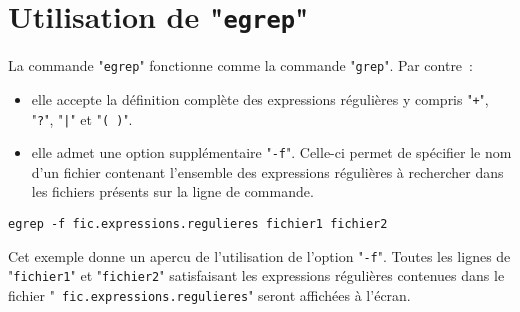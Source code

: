 \section{\label{adv-fltrs-egrep}Utilisation de "{\tt egrep}"}

La
commande "{\tt egrep}" fonctionne comme la commande "{\tt grep}".
Par contre~:
\begin{itemize}
	\item	elle accepte la d{\'e}finition compl{\`e}te des expressions r{\'e}guli{\`e}res
			y compris "\verb=+=", "\verb=?=", "\verb=|="
			et "\verb=( )=".
	\item	elle admet une option suppl{\'e}mentaire "{\tt -f}".
			Celle-ci permet de sp{\'e}cifier le nom d'un fichier contenant
			l'ensemble des expressions r{\'e}guli{\`e}res {\`a} rechercher dans
			les fichiers pr{\'e}sents sur la ligne de commande.
\end{itemize}

\begin{example}
\begin{verbatim}
egrep -f fic.expressions.regulieres fichier1 fichier2
\end{verbatim}
Cet exemple donne un apercu de l'utilisation de l'option "{\tt -f}".
Toutes les lignes de "{\tt fichier1}" et "{\tt fichier2}"
satisfaisant les expressions r{\'e}guli{\`e}res contenues dans le fichier "{\tt
fic.expressions.regulieres}" seront affich{\'e}es {\`a} l'{\'e}cran.
\end{example}

